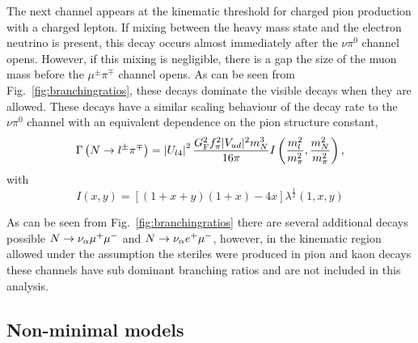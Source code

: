\documentclass[11pt, a4paper]{article}
\newcommand{\reffig}[1]{Fig.~\ref{#1}}
\def\ster{\ensuremath N}
\begin{document}
The next channel appears at the kinematic threshold for charged pion production
with a charged lepton. If mixing between the heavy mass state and the electron
neutrino is present, this decay occurs almost immediately after the $\nu\pi^0$
channel opens. However, if this mixing is negligible, there is a gap the size of
the muon mass before the $\mu^\pm\pi^\mp$ channel opens. As can be seen from
\reffig{fig:branchingratios}, these decays dominate the visible decays when
they are allowed. These decays have a similar scaling behaviour of the decay
rate to the $\nu\pi^0$ channel with an equivalent dependence on the pion
structure constant,
%
\[ \Gamma\left(\ster\to l^\pm\pi^\mp\right) =
	\left|U_{l4}\right|^2\frac{G_\text{F}^2f_\pi^2 |V_{ud}|^2  m_\ster^3}{16\pi}I\left(\frac{m_l^2}{m_\pi^2} , \frac{m_\ster^2}{m_\pi^2}\right) ,
\]
with 
\[
	I(x,y) = \left[ \left( 1+x+y\right) \left(1+x\right) -4 x\right] \lambda^\frac{1}{2}\left(1,x,y\right)
\]

As can be seen from \reffig{fig:branchingratios} there are several additional
decays possible $\ster\rightarrow \nu_\alpha \mu^+ \mu^-$ and $\ster
\rightarrow \nu_\alpha e^+ \mu^-$, however, in the kinematic region allowed
under the assumption the steriles were produced in pion and kaon decays these
channels have sub dominant branching ratios and are not included in this
analysis.


\subsection{Non-minimal models}
\end{document}
